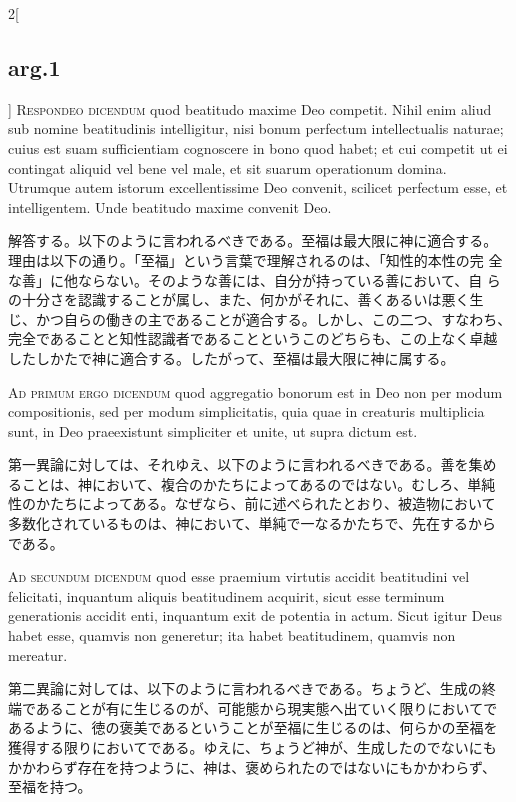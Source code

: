 \documentclass[paper=a4paper,fontsize=10pt,jafontsize=9pt,titlepage]{jlreq}
\begin{document}
\begin{paracol}{2}[\subsection{arg.1}]
{\scshape Respondeo dicendum} quod beatitudo maxime Deo competit. Nihil enim aliud
sub nomine beatitudinis intelligitur, nisi bonum perfectum
intellectualis naturae; cuius est suam sufficientiam cognoscere in bono
quod habet; et cui competit ut ei contingat aliquid vel bene vel male,
et sit suarum operationum domina. Utrumque autem istorum excellentissime
Deo convenit, scilicet perfectum esse, et intelligentem. Unde beatitudo
maxime convenit Deo.

\switchcolumn

解答する。以下のように言われるべきである。至福は最大限に神に適合する。
理由は以下の通り。「至福」という言葉で理解されるのは、「知性的本性の完
全な善」に他ならない。そのような善には、自分が持っている善において、自
らの十分さを認識することが属し、また、何かがそれに、善くあるいは悪く生
じ、かつ自らの働きの主であることが適合する。しかし、この二つ、すなわち、
完全であることと知性認識者であることというこのどちらも、この上なく卓越
したしかたで神に適合する。したがって、至福は最大限に神に属する。

\switchcolumn*[\subsection{ad.1}]

{\scshape Ad primum ergo dicendum} quod aggregatio bonorum est in Deo non per modum
compositionis, sed per modum simplicitatis, quia quae in creaturis
multiplicia sunt, in Deo praeexistunt simpliciter et unite, ut supra
dictum est.

\switchcolumn

第一異論に対しては、それゆえ、以下のように言われるべきである。善を集め
ることは、神において、複合のかたちによってあるのではない。むしろ、単純
性のかたちによってある。なぜなら、前に述べられたとおり、被造物において
多数化されているものは、神において、単純で一なるかたちで、先在するから
である。

\switchcolumn*[\subsection{ad.2}]

{\scshape Ad secundum dicendum} quod esse praemium virtutis accidit beatitudini vel
felicitati, inquantum aliquis beatitudinem acquirit, sicut esse terminum
generationis accidit enti, inquantum exit de potentia in actum. Sicut
igitur Deus habet esse, quamvis non generetur; ita habet beatitudinem,
quamvis non mereatur.

\switchcolumn

第二異論に対しては、以下のように言われるべきである。ちょうど、生成の終
端であることが有に生じるのが、可能態から現実態へ出ていく限りにおいてで
あるように、徳の褒美であるということが至福に生じるのは、何らかの至福を
獲得する限りにおいてである。ゆえに、ちょうど神が、生成したのでないにも
かかわらず存在を持つように、神は、褒められたのではないにもかかわらず、
至福を持つ。

\end{paracol}
\end{document}
